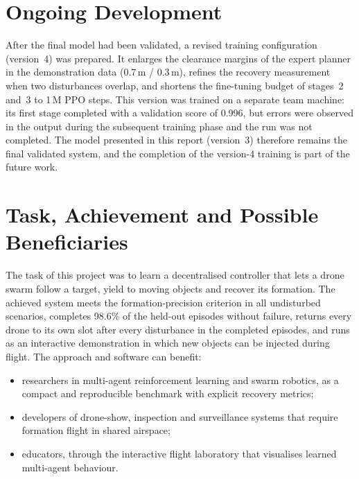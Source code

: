 \section{Ongoing Development}
After the final model had been validated, a revised training configuration (version~4) was prepared. It enlarges
the clearance margins of the expert planner in the demonstration data (0.7\,m / 0.3\,m), refines the recovery
measurement when two disturbances overlap, and shortens the fine-tuning budget of stages~2 and~3 to 1\,M PPO
steps. This version was trained on a separate team machine: its first stage completed with a validation score
of 0.996, but errors were observed in the output during the subsequent training phase and the run was not
completed. The model presented in this report (version~3) therefore remains the final validated system, and the
completion of the version-4 training is part of the future work.

\section{Task, Achievement and Possible Beneficiaries}
The task of this project was to learn a decentralised controller that lets a drone swarm follow a target, yield
to moving objects and recover its formation. The achieved system meets the formation-precision criterion in all
undisturbed scenarios, completes 98.6\% of the held-out episodes without failure, returns every drone to its own
slot after every disturbance in the completed episodes, and runs as an interactive demonstration in which new
objects can be injected during flight. The approach and software can benefit:
\begin{itemize}
  \item researchers in multi-agent reinforcement learning and swarm robotics, as a compact and reproducible
        benchmark with explicit recovery metrics;
  \item developers of drone-show, inspection and surveillance systems that require formation flight in shared
        airspace;
  \item educators, through the interactive flight laboratory that visualises learned multi-agent behaviour.
\end{itemize}

